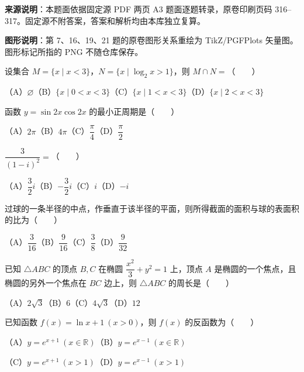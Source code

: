 


\begin{gktip}
\textbf{来源说明}：本题面依据固定源 PDF 两页 A3 题面逐题转录，原卷印刷页码 316–317。固定源不附答案，答案和解析均由本库独立复算。

\textbf{图形说明}：第 7、16、19、21 题的原卷图形关系重绘为 TikZ/PGFPlots 矢量图。图形标记所指的 PNG 不随仓库保存。
\end{gktip}


\begin{question}
设集合 $M=\{x\mid x<3\}$，$N=\{x\mid\log_2x>1\}$，则 $M\cap N=$\mbox{（　　）}

（A）$\varnothing$\quad（B）$\{x\mid0<x<3\}$\quad（C）$\{x\mid1<x<3\}$\quad（D）$\{x\mid2<x<3\}$

\end{question}
\begin{question}
函数 $y=\sin2x\cos2x$ 的最小正周期是\mbox{（　　）}

（A）$2\pi$\quad（B）$4\pi$\quad（C）$\dfrac\pi4$\quad（D）$\dfrac\pi2$

\end{question}
\begin{question}
$\dfrac{3}{(1-i)^2}=$\mbox{（　　）}

（A）$\dfrac32i$\quad（B）$-\dfrac32i$\quad（C）$i$\quad（D）$-i$

\end{question}
\begin{question}
过球的一条半径的中点，作垂直于该半径的平面，则所得截面的面积与球的表面积的比为\mbox{（　　）}

（A）$\dfrac3{16}$\quad（B）$\dfrac9{16}$\quad（C）$\dfrac38$\quad（D）$\dfrac9{32}$

\end{question}
\begin{question}
已知 $\triangle ABC$ 的顶点 $B,C$ 在椭圆 $\dfrac{x^2}{3}+y^2=1$ 上，顶点 $A$ 是椭圆的一个焦点，且椭圆的另外一个焦点在 $BC$ 边上，则 $\triangle ABC$ 的周长是\mbox{（　　）}

（A）$2\sqrt3$\quad（B）$6$\quad（C）$4\sqrt3$\quad（D）$12$

\end{question}
\begin{question}
已知函数 $f(x)=\ln x+1\ (x>0)$，则 $f(x)$ 的反函数为\mbox{（　　）}

（A）$y=e^{x+1}\ (x\in\mathbb R)$\quad（B）$y=e^{x-1}\ (x\in\mathbb R)$

（C）$y=e^{x+1}\ (x>1)$\quad（D）$y=e^{x-1}\ (x>1)$

\Needspace{0.4\textheight}
\end{question}
